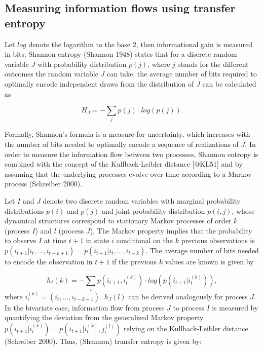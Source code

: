 \documentclass[
]{article}
\begin{document}
\hypertarget{measuring-information-flows-using-transfer-entropy}{%
\subsection{Measuring information flows using transfer
entropy}\label{measuring-information-flows-using-transfer-entropy}}

Let \(log\) denote the logarithm to the base 2, then informational gain
is measured in bits. Shannon entropy (Shannon 1948) states that for a
discrete random variable \(J\) with probability distribution \(p(j)\),
where \(j\) stands for the different outcomes the random variable \(J\)
can take, the average number of bits required to optimally encode
independent draws from the distribution of \(J\) can be calculated as

\[
  H_J = - \sum_j p(j) \cdot log \left(p(j)\right).
\]

Formally, Shannon's formula is a measure for uncertainty, which
increases with the number of bits needed to optimally encode a sequence
of realizations of \(J\). In order to measure the information flow
between two processes, Shannon entropy is combined with the concept of
the Kullback-Leibler distance {[}@KL51{]} and by assuming that the
underlying processes evolve over time according to a Markov process
(Schreiber 2000).

Let \(I\) and \(J\) denote two discrete random variables with marginal
probability distributions \(p(i)\) and \(p(j)\) and joint probability
distribution \(p(i,j)\), whose dynamical structures correspond to
stationary Markov processes of order \(k\) (process \(I\)) and \(l\)
(process \(J\)). The Markov property implies that the probability to
observe \(I\) at time \(t+1\) in state \(i\) conditional on the \(k\)
previous observations is
\(p(i_{t+1}|i_t,...,i_{t-k+1})=p(i_{t+1}|i_t,...,i_{t-k})\). The average
number of bits needed to encode the observation in \(t+1\) if the
previous \(k\) values are known is given by

\[
  h_I(k)=- \sum_i p\left(i_{t+1}, i_t^{(k)}\right) \cdot log \left(p\left(i_{t+1}|i_t^{(k)}\right)\right),
\] where \(i^{(k)}_t=(i_t,...,i_{t-k+1})\). \(h_J(l)\) can be derived
analogously for process \(J\). In the bivariate case, information flow
from process \(J\) to process \(I\) is measured by quantifying the
deviation from the generalized Markov property
\(p(i_{t+1}| i_t^{(k)})=p(i_{t+1}| i_t^{(k)},j_t^{(l)})\) relying on the
Kullback-Leibler distance (Schreiber 2000). Thus, (Shannon) transfer
entropy is given by:
\end{document}
